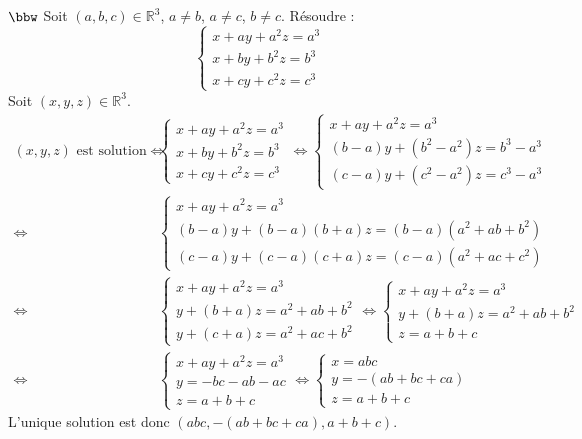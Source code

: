 \documentclass[11pt]{article}
\begin{document}
\begin{exercice}{$\bbw$}{}
    Soit $(a,b,c)\in\mathbb{R}^3$, $a \neq b$, $a \neq c$, $b \neq c$. Résoudre :
    \begin{equation*}
        \begin{cases}
            x+ay+a^2z=a^3\\
            x+by+b^2z=b^3\\
            x+cy+c^2z=c^3
        \end{cases}
    \end{equation*}
    \tcblower
    Soit $(x,y,z)\in\mathbb{R}^3$.
    \begin{align*}
        (x,y,z) \text{ est solution} \iff&
        \begin{cases}
            x+ay+a^2z=a^3\\
            x+by+b^2z=b^3\\
            x+cy+c^2z=c^3
        \end{cases}
        \iff
        \begin{cases}
            x+ay+a^2z=a^3\\
            (b-a)y+(b^2-a^2)z=b^3-a^3\\
            (c-a)y+(c^2-a^2)z=c^3-a^3
        \end{cases}
        \\\iff &
        \begin{cases}
            x+ay+a^2z=a^3\\
            (b-a)y+(b-a)(b+a)z=(b-a)(a^2+ab+b^2)\\
            (c-a)y+(c-a)(c+a)z=(c-a)(a^2+ac+c^2)
        \end{cases}
        \\ \iff&
        \begin{cases}
            x+ay+a^2z=a^3\\
            y+(b+a)z=a^2+ab+b^2\\
            y+(c+a)z=a^2+ac+b^2
        \end{cases}
        \iff
        \begin{cases}
            x+ay+a^2z=a^3\\
            y+(b+a)z=a^2+ab+b^2\\
            z =a + b + c
        \end{cases}
        \\ \iff& 
        \begin{cases}
            x+ay+a^2z=a^3\\
            y=-bc - ab - ac\\
            z = a + b + c
        \end{cases}
        \iff
        \begin{cases}
            x=abc\\
            y=-(ab + bc + ca)\\
            z = a + b + c
        \end{cases}
    \end{align*}
    L'unique solution est donc $(abc, -(ab + bc + ca), a+b+c)$.
\end{exercice}
\end{document}
